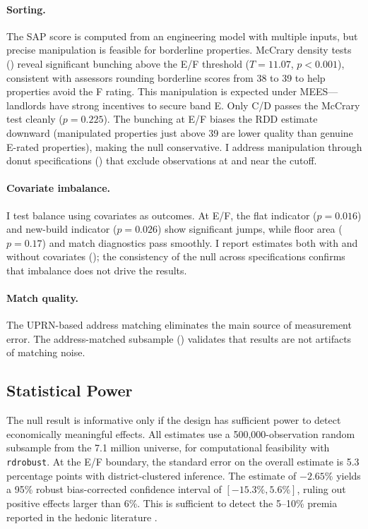 \documentclass[12pt]{article}
\begin{document}
\paragraph{Sorting.} The SAP score is computed from an engineering model with multiple inputs, but precise manipulation is feasible for borderline properties. McCrary density tests () reveal significant bunching above the E/F threshold ($T = 11.07$, $p < 0.001$), consistent with assessors rounding borderline scores from 38 to 39 to help properties avoid the F rating. This manipulation is expected under MEES---landlords have strong incentives to secure band E. Only C/D passes the McCrary test cleanly ($p = 0.225$). The bunching at E/F biases the RDD estimate downward (manipulated properties just above 39 are lower quality than genuine E-rated properties), making the null conservative. I address manipulation through donut specifications () that exclude observations at and near the cutoff.

\paragraph{Covariate imbalance.} I test balance using covariates as outcomes. At E/F, the flat indicator ($p = 0.016$) and new-build indicator ($p = 0.026$) show significant jumps, while floor area ($p = 0.17$) and match diagnostics pass smoothly. I report estimates both with and without covariates (); the consistency of the null across specifications confirms that imbalance does not drive the results.

\paragraph{Match quality.} The UPRN-based address matching eliminates the main source of measurement error. The address-matched subsample () validates that results are not artifacts of matching noise.

\subsection{Statistical Power}

The null result is informative only if the design has sufficient power to detect economically meaningful effects. All estimates use a 500,000-observation random subsample from the 7.1 million universe, for computational feasibility with \texttt{rdrobust}. At the E/F boundary, the standard error on the overall estimate is 5.3 percentage points with district-clustered inference. The estimate of $-2.65\%$ yields a 95\% robust bias-corrected confidence interval of $[-15.3\%, 5.6\%]$, ruling out positive effects larger than 6\%. This is sufficient to detect the 5--10\% premia reported in the hedonic literature \citep{fuerst2015does, aydin2020capitalization}.
\end{document}
